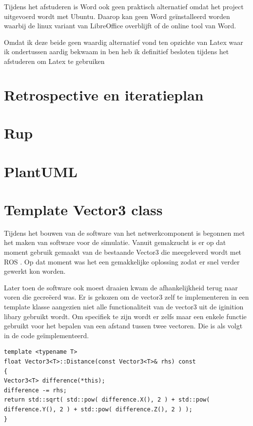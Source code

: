 \documentclass[a4paper, 11pt, oneside]{report}
\begin{document}
Tijdens het afstuderen is Word ook geen praktisch alternatief omdat het project uitgevoerd wordt met Ubuntu. 
Daarop kan geen Word geïnstalleerd worden waarbij de linux variant van LibreOffice overblijft of de online tool van Word.

Omdat ik deze beide geen waardig alternatief vond ten opzichte van Latex waar ik ondertussen aardig bekwaam in ben heb ik definitief besloten tijdens het afstuderen om Latex te gebruiken

\section{Retrospective en iteratieplan}

\section{Rup}

\section{PlantUML}

\section{Template Vector3 class}

Tijdens het bouwen van de software van het netwerkcomponent is begonnen met het maken van software voor de simulatie.
Vanuit gemakzucht is er op dat moment gebruik gemaakt van de bestaande Vector3 die meegeleverd wordt met ROS \cite{ignitionVector}.
Op dat moment was het een gemakkelijke oplossing zodat er snel verder gewerkt kon worden. 

Later toen de software ook moest draaien kwam de afhankelijkheid terug naar voren die gecreëerd was.
Er is gekozen om de vector3 zelf te implementeren in een template klasse aangezien niet alle functionaliteit van de vector3 uit de iginition libary\cite{ignitionVector} gebruikt wordt.
Om specifiek te zijn wordt er zelfs maar een enkele functie gebruikt voor het bepalen van een afstand tussen twee vectoren.
Die is als volgt in de code geïmplementeerd. 

\begin{lstlisting}
template <typename T>
float Vector3<T>::Distance(const Vector3<T>& rhs) const
{
Vector3<T> difference(*this);
difference -= rhs;
return std::sqrt( std::pow( difference.X(), 2 ) + std::pow( difference.Y(), 2 ) + std::pow( difference.Z(), 2 ) );
}
\end{lstlisting}
\end{document}

